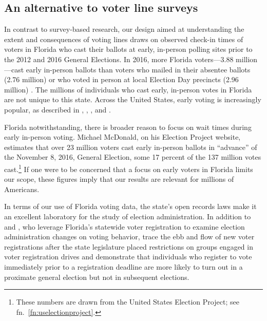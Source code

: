 \documentclass[12pt,titlepage]{article}
\begin{document}

\subsection*{An alternative to voter line surveys}

In contrast to survey-based research, our design aimed at
understanding the extent and consequences of voting lines draws on
\mbox{observed} check-in times of voters in Florida who cast their
ballots at early, in-person polling sites prior to the 2012 and 2016
General Elections.  In 2016, more Florida voters---3.88 million---cast
early in-person ballots than voters who mailed in their absentee
ballots (2.76 million) or who voted in person at local Election Day
precincts (2.96 million) \citep{FDOS:2016vote}. The millions of
individuals who cast early, in-person votes in Florida are not unique
to this state. Across the United States, early voting is increasingly
popular, as described in \citet{neelyrichardson:earlyvoting},
\citet{gronkebaum:growth}, \citet{gronketoffey:psychological}, and
\citet{burdenetal:unanticipated}.




Florida notwithstanding, there is broader reason to focus on wait times
during early in-person voting. Michael McDonald, on his Election
Project website, estimates that over 23 million voters cast early
in-person ballots in ``advance'' of the November 8, 2016, General
Election, some 17 percent of the 137 million votes
cast.\footnote{These numbers are drawn from the United States Election
  Project; see fn.\ \ref{fn:uselectionproject}.} If one were to be
concerned that a focus on early voters in Florida limits our scope,
these figures imply that our results are relevant for millions of
Americans.


In terms of our use of Florida voting data, the state's open records
laws make it an excellent laboratory for the study of election
administration. In addition to \cite{herronsmith:closingtimes} and
\cite{amos_etal2017}, who leverage Florida's statewide voter
registration to examine election administration changes on voting
behavior, \cite{herron_smith2013} trace the ebb and flow of new voter
registrations after the state legislature placed restrictions on
groups engaged in voter registration drives and
\cite{shinosmith:registrationtiming} demonstrate that individuals who
register to vote immediately prior to a registration deadline are more
likely to turn out in a proximate general election but not in
subsequent elections.
\end{document}
